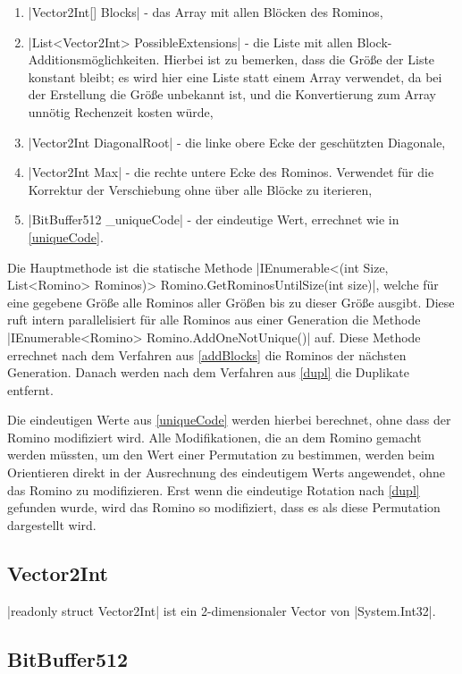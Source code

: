 \documentclass[a4paper,10pt,ngerman]{scrartcl}
\begin{document}
\begin{enumerate}
    \item |Vector2Int[] Blocks| - 
        das Array mit allen Blöcken des Rominos,
    \item |List<Vector2Int> PossibleExtensions| - 
        die Liste mit allen Block-Additionsmöglichkeiten.
        Hierbei ist zu bemerken, dass die Größe der Liste konstant bleibt; es wird hier eine Liste statt einem Array verwendet, da bei der Erstellung die Größe unbekannt ist, und die Konvertierung zum Array unnötig Rechenzeit kosten würde,
    \item |Vector2Int DiagonalRoot| - die linke obere Ecke der 
        geschützten Diagonale,
    \item |Vector2Int Max| - die rechte untere Ecke des Rominos.
        Verwendet für die Korrektur der Verschiebung ohne über alle Blöcke zu
        iterieren,
    \item |BitBuffer512 _uniqueCode| - der eindeutige Wert, errechnet
        wie in \cref{uniqueCode}.
\end{enumerate}

Die Hauptmethode ist die statische Methode
|IEnumerable<(int Size, List<Romino> Rominos)> Romino.GetRominosUntilSize(int size)|,
welche für eine gegebene Größe alle Rominos aller Größen bis zu dieser
Größe ausgibt. Diese ruft intern parallelisiert für alle Rominos aus einer
Generation die Methode |IEnumerable<Romino> Romino.AddOneNotUnique()|
auf.
Diese Methode errechnet nach dem Verfahren aus \cref{addBlocks} die
Rominos der nächsten Generation.
Danach werden nach dem Verfahren aus \cref{dupl} die Duplikate entfernt.

Die eindeutigen Werte aus \cref{uniqueCode} werden hierbei berechnet, ohne
dass der Romino modifiziert wird. Alle Modifikationen, die an dem Romino
gemacht werden müssten, um den Wert einer Permutation zu bestimmen, werden
beim Orientieren direkt in der Ausrechnung des eindeutigem Werts angewendet, ohne das Romino zu
modifizieren. Erst wenn die eindeutige Rotation nach \cref{dupl} gefunden
wurde, wird das Romino so modifiziert, dass es als diese Permutation
dargestellt wird.

\subsection{Vector2Int}

|readonly struct Vector2Int| ist ein 2-dimensionaler Vector von
|System.Int32|.

\subsection{BitBuffer512}
\end{document}
